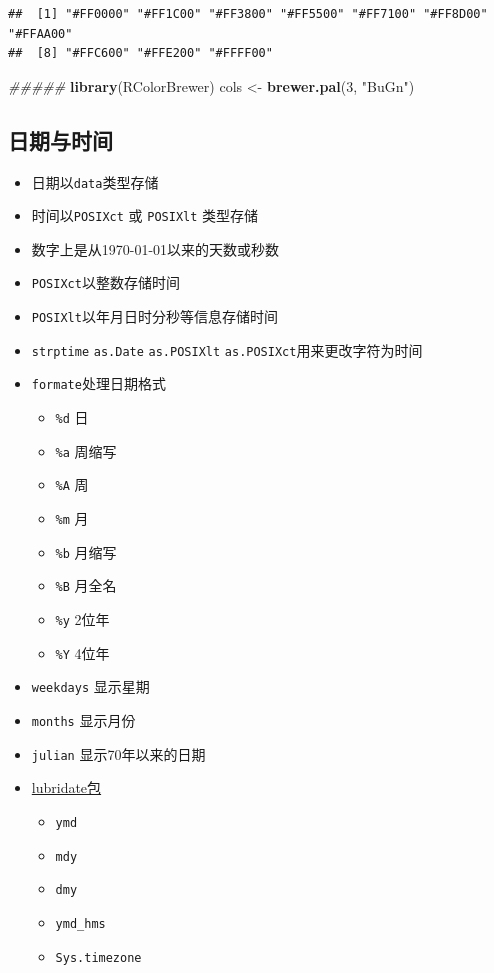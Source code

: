 \documentclass[]{book}
\newenvironment{Shaded}{\begin{snugshade}}{\end{snugshade}}
\newcommand{\CommentTok}[1]{\textcolor[rgb]{0.56,0.35,0.01}{\textit{#1}}}
\newcommand{\DecValTok}[1]{\textcolor[rgb]{0.00,0.00,0.81}{#1}}
\newcommand{\KeywordTok}[1]{\textcolor[rgb]{0.13,0.29,0.53}{\textbf{#1}}}
\newcommand{\NormalTok}[1]{#1}
\newcommand{\StringTok}[1]{\textcolor[rgb]{0.31,0.60,0.02}{#1}}
\providecommand{\tightlist}{%
  \setlength{\itemsep}{0pt}\setlength{\parskip}{0pt}}
\begin{document}
\begin{verbatim}
##  [1] "#FF0000" "#FF1C00" "#FF3800" "#FF5500" "#FF7100" "#FF8D00" "#FFAA00"
##  [8] "#FFC600" "#FFE200" "#FFFF00"
\end{verbatim}

\begin{Shaded}
\begin{Highlighting}[]
\CommentTok{#####}
\KeywordTok{library}\NormalTok{(RColorBrewer)}
\NormalTok{cols <-}\StringTok{ }\KeywordTok{brewer.pal}\NormalTok{(}\DecValTok{3}\NormalTok{, }\StringTok{"BuGn"}\NormalTok{)}
\end{Highlighting}
\end{Shaded}

\subsection{日期与时间}

\begin{itemize}
\tightlist
\item
  日期以\texttt{data}类型存储
\item
  时间以\texttt{POSIXct} 或 \texttt{POSIXlt} 类型存储
\item
  数字上是从1970-01-01以来的天数或秒数
\item
  \texttt{POSIXct}以整数存储时间
\item
  \texttt{POSIXlt}以年月日时分秒等信息存储时间
\item
  \texttt{strptime} \texttt{as.Date} \texttt{as.POSIXlt} \texttt{as.POSIXct}用来更改字符为时间
\item
  \texttt{formate}处理日期格式

  \begin{itemize}
  \tightlist
  \item
    \texttt{\%d} 日
  \item
    \texttt{\%a} 周缩写
  \item
    \texttt{\%A} 周
  \item
    \texttt{\%m} 月
  \item
    \texttt{\%b} 月缩写
  \item
    \texttt{\%B} 月全名
  \item
    \texttt{\%y} 2位年
  \item
    \texttt{\%Y} 4位年
  \end{itemize}
\item
  \texttt{weekdays} 显示星期
\item
  \texttt{months} 显示月份
\item
  \texttt{julian} 显示70年以来的日期
\item
  \href{http://cran.r-project.org/web/packages/lubridate/vignettes/lubridate.html}{lubridate包}

  \begin{itemize}
  \tightlist
  \item
    \texttt{ymd}
  \item
    \texttt{mdy}
  \item
    \texttt{dmy}
  \item
    \texttt{ymd\_hms}
  \item
    \texttt{Sys.timezone}
  \end{itemize}
\end{itemize}
\end{document}
